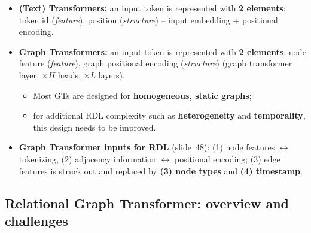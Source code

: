 \begin{itemize}
  \item \textbf{(Text) Transformers:} an input token is represented with \textbf{2
    elements}: token id (\emph{feature}), position (\emph{structure}) -- input embedding
    + positional encoding.
  \item \textbf{Graph Transformers:} an input token is represented with \textbf{2
    elements}: node feature (\emph{feature}), graph positional encoding
    (\emph{structure}) (graph transformer layer, $\times H$ heads, $\times L$ layers).
    \begin{itemize}
      \item Most GTs are designed for \textbf{homogeneous, static graphs};
      \item for additional RDL complexity such as \textbf{heterogeneity} and
        \textbf{temporality}, this design needs to be improved.
    \end{itemize}
  \item \textbf{Graph Transformer inputs for RDL} (slide~48): (1) node features
    $\leftrightarrow$ tokenizing, (2) adjacency information $\leftrightarrow$ positional
    encoding; (3) edge features is struck out and replaced by \textbf{(3) node types}
    and \textbf{(4) timestamp}.
\end{itemize}

\subsection{Relational Graph Transformer: overview and challenges}\label{sec:lec13-relgt-ov}

